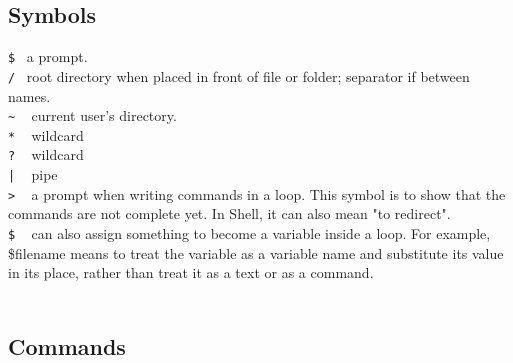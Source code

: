 \documentclass{article}
\begin{document}
\subsection{\textbf{Symbols}}
\texttt{\$}~
a prompt.\\
\texttt{/}~	root directory when placed in front of file or folder; separator if between names.\\
\texttt{\~{}} ~	current user's directory.\\
\texttt{*} ~ wildcard\\
\texttt{?} ~	 wildcard\\
\texttt{|} ~	 pipe\\
\texttt{>} ~ a prompt when writing commands in a loop. This symbol is to show that the commands are not complete yet.  In Shell, it can also mean "to redirect". \\ 
\texttt{\$} ~ can also assign something to become a variable inside a loop. For example, \$filename means to treat the variable as a variable name and substitute its value in its place, rather than treat it as a text or as a command.\\
\\
\subsection{\textbf{Commands}}
\end{document}

